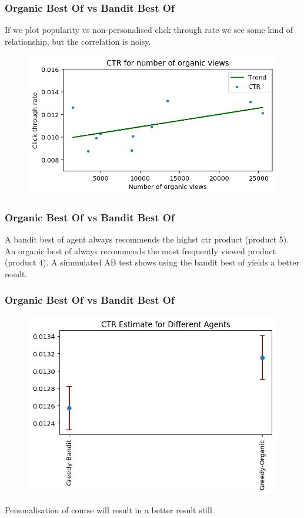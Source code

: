 \begin{frame}
\frametitle{Organic Best Of vs Bandit Best Of}

If we plot popularity vs non-personalised click through rate we see some kind of relationship, but the correlation is noisy.


\begin{figure}[h!]
\includegraphics[scale=0.4]{images/organic_bestof3.png}
\centering
\label{motex1}
\end{figure}
\end{frame}

\begin{frame}
\frametitle{Organic Best Of vs Bandit Best Of}

A bandit best of agent always recommends the highst ctr product (product 5).  An organic best of always recommends the most frequently viewed product (product 4).  A simmulated AB test shows using the bandit best of yields a better result.

\end{frame}

\begin{frame}
  \frametitle{Organic Best Of vs Bandit Best Of}
  
\begin{figure}[h!]
\includegraphics[scale=0.4]{images/organic_bestof4.png}
\centering
\label{motex1}
\end{figure}

\pause
Personalisation of course will result in a better result still.
\end{frame}


